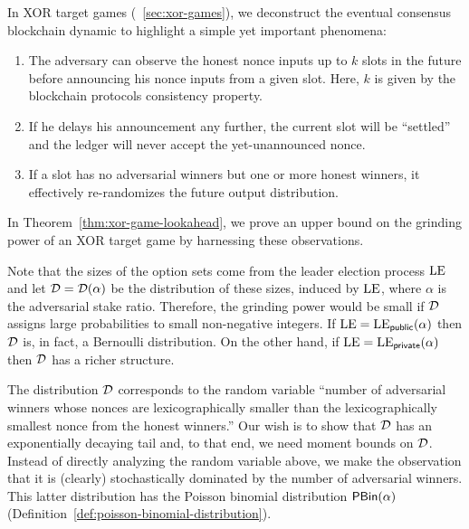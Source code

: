     In XOR target games (\Section~\ref{sec:xor-games}), 
    we deconstruct the eventual consensus blockchain dynamic 
    to highlight a simple yet important phenomena: 
    \begin{enumerate}
        \item The adversary can observe the honest nonce inputs up to $k$ slots in the future 
        before announcing his nonce inputs from a given slot.
        Here, $k$ is given by the blockchain protocols consistency property.

        \item If he delays his announcement any further, the current slot will be ``settled'' 
        and the ledger will never accept the yet-unannounced nonce.

        \item If a slot has no adversarial winners but one or more honest winners, 
        it effectively re-randomizes the future output distribution.
    \end{enumerate}
    In Theorem~\ref{thm:xor-game-lookahead}, 
    we prove an upper bound on the grinding power of an XOR target game 
    by harnessing these observations. 

    Note that the sizes of the option sets come from 
    the leader election process $\mathrm{LE}$
    and let $\mathcal{D} = \mathcal{D}(\alpha)$ be the distribution 
    of these sizes, induced by $\mathrm{LE}$, 
    where $\alpha$ is the adversarial stake ratio.
    Therefore, the grinding power would be small if 
    $\mathcal{D}$ assigns large probabilities to small non-negative integers.
    If $\mathrm{LE} = \mathrm{LE}_\mathsf{public}(\alpha)$ then $\mathcal{D}$ is, in fact, 
    a Bernoulli distribution. 
    On the other hand, if $\mathrm{LE} = \mathrm{LE}_\mathsf{private}(\alpha)$ then 
    $\mathcal{D}$ has a richer structure.

    The distribution $\mathcal{D}$ corresponds to the random variable 
    ``number of adversarial winners whose nonces are lexicographically smaller 
    than the lexicographically smallest nonce from the honest winners.'' 
    Our wish is to show that 
    $\mathcal{D}$ has an exponentially decaying tail 
    and, to that end, 
    we need moment bounds on $\mathcal{D}$. 
    Instead of directly analyzing the random variable above, 
    we make the observation that it is (clearly) 
    stochastically dominated by 
    the number of adversarial winners.
    This latter distribution has the Poisson binomial distribution 
    $\mathsf{PBin}(\alpha)$ 
    (Definition~\ref{def:poisson-binomial-distribution}).
    
